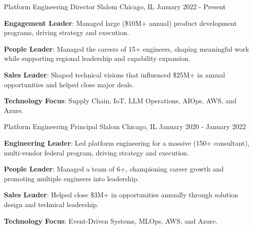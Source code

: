 

\begin{cventries}

  \cventry
    {Platform Engineering Director} %
    {Slalom} %
    {Chicago, IL} %
    {January 2022 - Present} %
    {
      \begin{cvitems} %
        \item {\textbf{Engagement Leader}: Managed large (\$10M+ annual) product development programs, driving strategy and execution.}
        \item {\textbf{People Leader}: Managed the careers of 15+ engineers, shaping meaningful work while supporting regional leadership and capability expansion.}
        \item {\textbf{Sales Leader}: Shaped technical visions that influenced \$25M+ in annual opportunities and helped close major deals.}
        \item {\textbf{Technology Focus}: Supply Chain, IoT, LLM Operations, AIOps, AWS, and Azure.}
      \end{cvitems}
    }

  \cventry
    {Platform Engineering Principal} %
    {Slalom} %
    {Chicago, IL} %
    {January 2020 - January 2022} %
    {
      \begin{cvitems} %
        \item {\textbf{Engineering Leader}: Led platform engineering for a massive (150+ consultant), multi-vendor federal program, driving strategy and execution.}
        \item {\textbf{People Leader}: Managed a team of 6+, championing career growth and promoting multiple engineers into leadership.}
        \item {\textbf{Sales Leader}: Helped close \$3M+ in opportunities annually through solution design and technical leadership.}
        \item {\textbf{Technology Focus}: Event-Driven Systems, MLOps, AWS, and Azure.}
      \end{cvitems}
    }


\end{cventries}
